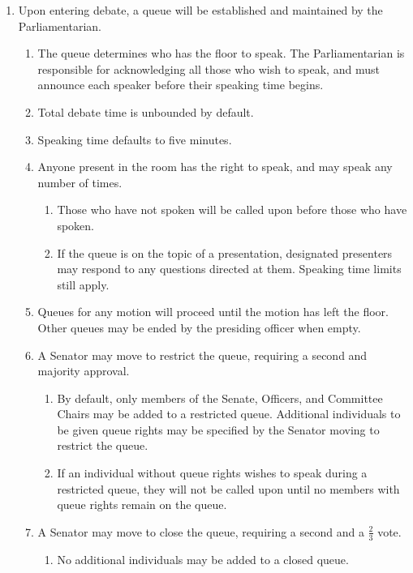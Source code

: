 
\begin{enumerate}

\item Upon entering debate, a queue will be established and maintained by the Parliamentarian.
\begin{enumerate}
    \item The queue determines who has the floor to speak. The Parliamentarian is responsible for acknowledging all those who wish to speak, and must announce each speaker before their speaking time begins.

    \item Total debate time is unbounded by default.

    \item Speaking time defaults to five minutes.

    \item Anyone present in the room has the right to speak, and may speak any number of times.
    \begin{enumerate}
        \item Those who have not spoken will be called upon before those who have spoken.
        \item If the queue is on the topic of a presentation, designated presenters may respond to any questions directed at them. Speaking time limits still apply.
    \end{enumerate}

    \item Queues for any motion will proceed until the motion has left the floor. Other queues may be ended by the presiding officer when empty.

    \item A Senator may move to restrict the queue, requiring a second and majority approval.
    \begin{enumerate}
        \item By default, only members of the Senate, Officers, and Committee Chairs may be added to a restricted queue. Additional individuals to be given queue rights may be specified by the Senator moving to restrict the queue.
        \item If an individual without queue rights wishes to speak during a restricted queue, they will not be called upon until no members with queue rights remain on the queue.
    \end{enumerate}

    \item A Senator may move to close the queue, requiring a second and a $\frac{2}{3}$ vote.
    \begin{enumerate}
        \item No additional individuals may be added to a closed queue.
    \end{enumerate}


\end{enumerate}
\end{enumerate}
